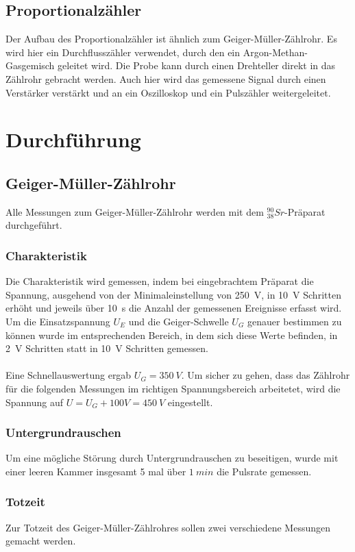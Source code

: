 \documentclass[12pt,a4paper]{article}
\begin{document}
\subsection{Proportionalzähler}
Der Aufbau des Proportionalzähler ist ähnlich zum Geiger-Müller-Zählrohr. Es wird hier ein Durchflusszähler verwendet, durch den ein Argon-Methan-Gasgemisch geleitet wird. Die Probe kann durch einen Drehteller direkt in das Zählrohr gebracht werden. Auch hier wird das gemessene Signal durch einen Verstärker verstärkt und an ein Oszilloskop und ein Pulszähler weitergeleitet.
\section{Durchführung}
\subsection{Geiger-Müller-Zählrohr}
Alle Messungen zum Geiger-Müller-Zählrohr werden mit dem $_{38}^{90}Sr$-Präparat durchgeführt.
\subsubsection{Charakteristik}
Die Charakteristik wird gemessen, indem bei eingebrachtem Präparat die Spannung, ausgehend von der Minimaleinstellung von \SI{250}{V}, in \SI{10}{V} Schritten erhöht und jeweils über \SI{10}{s} die Anzahl der gemessenen Ereignisse erfasst wird.\\
Um die Einsatzspannung $U_E$ und die Geiger-Schwelle $U_G$ genauer bestimmen zu können wurde im entsprechenden Bereich, in dem sich diese Werte befinden, in \SI{2}{V} Schritten statt in \SI{10}{V} Schritten gemessen.\\
\\Eine Schnellauswertung ergab $U_G = \SI{350}{V}$. Um sicher zu gehen, dass das Zählrohr für die folgenden Messungen im richtigen Spannungsbereich arbeitetet, wird die Spannung auf $U = U_G + 100V = \SI{450}{V}$ eingestellt.

\subsubsection{Untergrundrauschen}
Um eine mögliche Störung durch Untergrundrauschen zu beseitigen, wurde mit einer leeren Kammer insgesamt 5 mal über $\SI{1}{min}$ die Pulsrate gemessen.

\subsubsection{Totzeit}
Zur Totzeit des Geiger-Müller-Zählrohres sollen zwei verschiedene Messungen gemacht werden.
\end{document}
